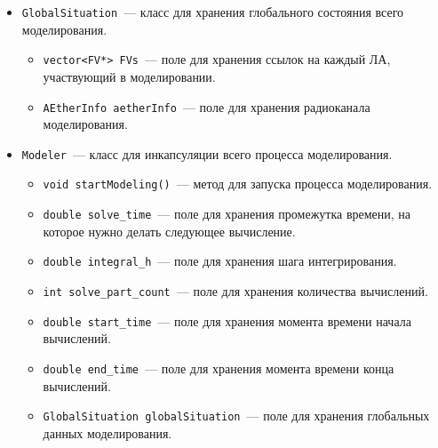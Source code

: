 \documentclass[a4paper,12pt]{article}
\begin{document}
\begin{itemize}
\begin{itemize}
    \end{itemize}
    \item \texttt{GlobalSituation}~--- класс для хранения глобального состояния всего моделирования.  
    \begin{itemize}
        \item \texttt{vector<FV*> FVs}~---  поле для хранения ссылок на каждый ЛА, участвующий в моделировании.
        \item \texttt{AEtherInfo aetherInfo}~--- поле для хранения радиоканала моделирования.
    \end{itemize}
     \item \texttt{Modeler}~--- класс для инкапсуляции всего процесса моделирования.
    \begin{itemize}
        \item \texttt{void startModeling()}~---  метод для запуска процесса  моделирования.
        \item \texttt{double solve\_time}~--- поле для хранения промежутка времени, на которое нужно делать следующее вычисление.
        \item \texttt{double integral\_h}~--- поле для хранения шага интегрирования.
        \item \texttt{int solve\_part\_count}~--- поле для хранения количества вычислений.
        \item \texttt{double start\_time}~--- поле для хранения момента времени начала вычислений.
        \item \texttt{double end\_time}~--- поле для хранения момента времени конца вычислений.
        \item \texttt{GlobalSituation globalSituation}~--- поле для хранения глобальных данных моделирования.
    \end{itemize}
\end{itemize}
\end{document}
